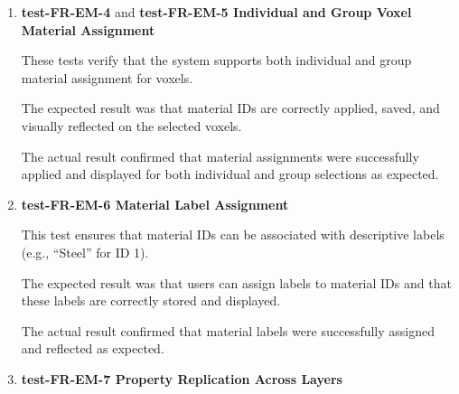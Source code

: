 \documentclass[12pt, titlepage]{article}
\begin{document}
\begin{enumerate}


\item \textbf{test-FR-EM-4} and \textbf{test-FR-EM-5 Individual and Group Voxel Material Assignment}

\hspace{1.5em} These tests verify that the system supports both individual and group material assignment for voxels.

The expected result was that material IDs are correctly applied, saved, and visually reflected on the selected voxels.

The actual result confirmed that material assignments were successfully applied and displayed for both individual and group selections as expected.



\item \textbf{test-FR-EM-6 Material Label Assignment}

\hspace{1.5em} This test ensures that material IDs can be associated with descriptive labels (e.g., ``Steel'' for ID 1).

The expected result was that users can assign labels to material IDs and that these labels are correctly stored and displayed.

The actual result confirmed that material labels were successfully assigned and reflected as expected.



\item \textbf{test-FR-EM-7 Property Replication Across Layers}


\end{enumerate}
\end{document}
